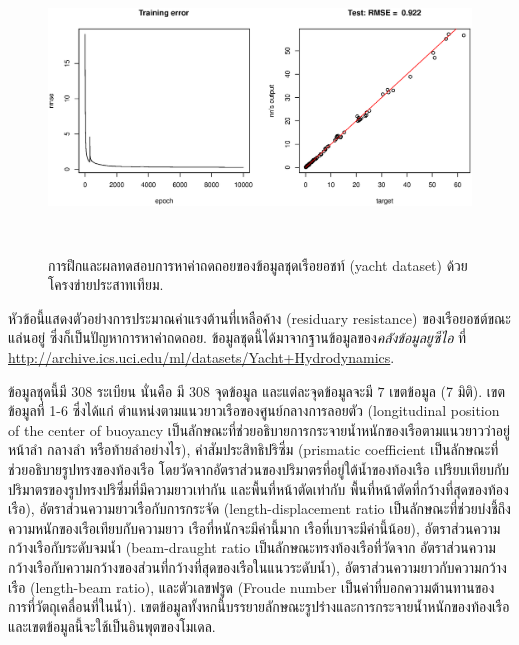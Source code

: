 %
\begin{figure}
\begin{center}
\includegraphics[height=3in]{04ANN/yachtExample.eps}
\end{center}
\caption{การฝึกและผลทดสอบการหาค่าถดถอยของข้อมูลชุดเรือยอชท์ (yacht dataset) ด้วยโครงข่ายประสาทเทียม.}
\label{fig: ANN regression example}
\end{figure}
%

หัวข้อนี้แสดงตัวอย่างการประมาณค่าแรงต้านที่เหลือค้าง (residuary resistance) ของเรือยอชต์ขณะแล่นอยู่ 
ซึ่งก็เป็นปัญหาการหาค่าถดถอย.
ข้อมูลชุดนี้ได้มาจากฐานข้อมูลของ\textit{คลังข้อมูลยูซีไอ}\cite{Bache+Lichman:2013} ที่
\url{http://archive.ics.uci.edu/ml/datasets/Yacht+Hydrodynamics}. 

ข้อมูลชุดนี้มี $308$ ระเบียน นั่นคือ มี $308$ จุดข้อมูล และแต่ละจุดข้อมูลจะมี $7$ เขตข้อมูล (7 มิติ).
เขตข้อมูลที่ 1-6 ซึ่งได้แก่ 
ตำแหน่งตามแนวยาวเรือของศูนย์กลางการลอยตัว (longitudinal position of the center of buoyancy เป็นลักษณะที่ช่วยอธิบายการกระจายน้ำหนักของเรือตามแนวยาวว่าอยู่หน้าลำ กลางลำ หรือท้ายลำอย่างไร),
ค่าสัมประสิทธิปริซึ่ม (prismatic coefficient เป็นลักษณะที่ช่วยอธิบายรูปทรงของท้องเรือ 
โดยวัดจากอัตราส่วนของปริมาตรที่อยู่ใต้น้ำของท้องเรือ 
เปรียบเทียบกับปริมาตรของรูปทรงปริซึ่มที่มีความยาวเท่ากัน 
และพื้นที่หน้าตัดเท่ากับ พื้นที่หน้าตัดที่กว้างที่สุดของท้องเรือ), 
อัตราส่วนความยาวเรือกับการกระจัด (length-displacement ratio เป็นลักษณะที่ช่วยบ่งชี้ถึงความหนักของเรือเทียบกับความยาว เรือที่หนักจะมีค่านี้มาก เรือที่เบาจะมีค่านี้น้อย), 
อัตราส่วนความกว้างเรือกับระดับจมน้ำ (beam-draught ratio เป็นลักษณะทรงท้องเรือที่วัดจาก อัตราส่วนความกว้างเรือกับความกว้างของส่วนที่กว้างที่สุดของเรือในแนวระดับน้ำ), 
อัตราส่วนความยาวกับความกว้างเรือ (length-beam ratio), 
และตัวเลขฟรูด (Froude number เป็นค่าที่บอกความต้านทานของการที่วัตถุเคลื่อนที่ในน้ำ).
เขตข้อมูลทั้งหกนี้บรรยายลักษณะรูปร่างและการกระจายน้ำหนักของท้องเรือ และเขตข้อมูลนี้จะใช้เป็นอินพุตของโมเดล.

